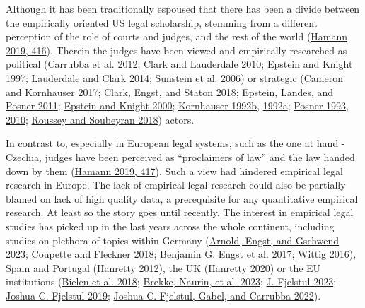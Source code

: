 \documentclass[
  11pt,
]{article}
\begin{document}
Although it has been traditionally espoused that there has been a divide
between the empirically oriented US legal scholarship, stemming from a
different perception of the role of courts and judges, and the rest of
the world (\protect\hyperlink{ref-hamannGermanFederalCourts2019}{Hamann
2019, 416}). Therein the judges have been viewed and empirically
researched as political
(\protect\hyperlink{ref-carrubbaWhoControlsContent2012}{Carrubba et al.
2012}; \protect\hyperlink{ref-clarkLocatingSupremeCourt2010}{Clark and
Lauderdale 2010};
\protect\hyperlink{ref-epsteinChoicesJusticesMake1997}{Epstein and
Knight 1997};
\protect\hyperlink{ref-lauderdaleScalingPoliticallyMeaningful2014}{Lauderdale
and Clark 2014};
\protect\hyperlink{ref-sunsteinAreJudgesPolitical2006}{Sunstein et al.
2006}) or strategic
(\protect\hyperlink{ref-cameronChapterWhatJudges2017}{Cameron and
Kornhauser 2017};
\protect\hyperlink{ref-clarkEstimatingEffectLeisure2018}{Clark, Engst,
and Staton 2018};
\protect\hyperlink{ref-epsteinWhyWhenJudges2011}{Epstein, Landes, and
Posner 2011};
\protect\hyperlink{ref-epsteinStrategicRevolutionJudicial2000}{Epstein
and Knight 2000};
\protect\hyperlink{ref-kornhauserModelingCollegialCourts1992}{Kornhauser
1992b},
\protect\hyperlink{ref-kornhauserModelingCollegialCourts1992a}{1992a};
\protect\hyperlink{ref-posnerWhatJudgesJustices1993}{Posner 1993},
\protect\hyperlink{ref-posnerHowJudgesThink2010}{2010};
\protect\hyperlink{ref-rousseyOverburdenedJudges2018}{Roussey and
Soubeyran 2018}) actors.

In contrast to, especially in European legal systems, such as the one at
hand - Czechia, judges have been perceived as ``proclaimers of law'' and
the law handed down by them
(\protect\hyperlink{ref-hamannGermanFederalCourts2019}{Hamann 2019,
417}). Such a view had hindered empirical legal research in Europe. The
lack of empirical legal research could also be partially blamed on lack
of high quality data, a prerequisite for any quantitative empirical
research. At least so the story goes until recently. The interest in
empirical legal studies has picked up in the last years across the whole
continent, including studies on plethora of topics within Germany
(\protect\hyperlink{ref-arnoldScalingCourtDecisions2023}{Arnold, Engst,
and Gschwend 2023};
\protect\hyperlink{ref-coupetteQuantitativeRechtswissenschaft2018}{Coupette
and Fleckner 2018};
\protect\hyperlink{ref-engstEinflussParteinaheAuf2017}{Benjamin G. Engst
et al. 2017};
\protect\hyperlink{ref-wittigOccurrenceSeparateOpinions2016}{Wittig
2016}), Spain and Portugal
(\protect\hyperlink{ref-hanrettyDissentIberiaIdeal2012}{Hanretty 2012}),
the UK
(\protect\hyperlink{ref-hanrettyCourtSpecialistsJudicial2020}{Hanretty
2020}) or the EU institutions
(\protect\hyperlink{ref-bielenBacklogsLitigationRates2018}{Bielen et al.
2018}; \protect\hyperlink{ref-brekkeThatOrderHow2023}{Brekke, Naurin, et
al. 2023}; \protect\hyperlink{ref-fjelstulHowChamberSystem2023}{J.
Fjelstul 2023};
\protect\hyperlink{ref-fjelstulEvolutionEuropeanUnion2019}{Joshua C.
Fjelstul 2019};
\protect\hyperlink{ref-fjelstulTimelyAdministrationJustice2022}{Joshua
C. Fjelstul, Gabel, and Carrubba 2022}).
\end{document}
